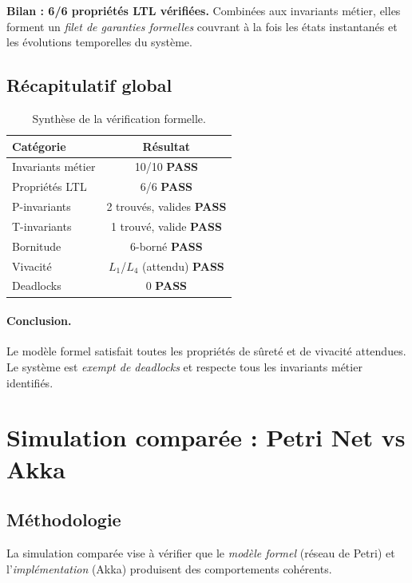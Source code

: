 \documentclass[11pt,a4paper]{article}
\newcommand{\PASS}{\textcolor{green!50!black}{\textbf{PASS}}}
\begin{document}
\noindent
\textbf{Bilan : 6/6 propriétés LTL vérifiées.} Combinées aux invariants
métier, elles forment un \emph{filet de garanties formelles} couvrant à la
fois les états instantanés et les évolutions temporelles du système.

\subsection{Récapitulatif global}

\begin{table}[H]
\centering\small
\begin{tabular}{l c}
\toprule
\rowcolor{tableheader}\textbf{Catégorie} & \textbf{Résultat} \\
\midrule
Invariants métier  & 10/10 \PASS \\
Propriétés LTL     & 6/6 \PASS \\
P-invariants       & 2 trouvés, valides \PASS \\
T-invariants       & 1 trouvé, valide \PASS \\
Bornitude          & 6-borné \PASS \\
Vivacité           & $L_1$/$L_4$ (attendu) \PASS \\
Deadlocks          & 0 \PASS \\
\bottomrule
\end{tabular}
\caption{Synthèse de la vérification formelle.}
\end{table}

\paragraph{Conclusion.}
Le modèle formel satisfait toutes les propriétés de sûreté et de vivacité
attendues. Le système est \emph{exempt de deadlocks} et respecte tous les
invariants métier identifiés.

\section{Simulation comparée : Petri Net vs Akka}

\subsection{Méthodologie}

La simulation comparée vise à vérifier que le \emph{modèle formel} (réseau
de Petri) et l'\emph{implémentation} (Akka) produisent des comportements
cohérents.
\end{document}
